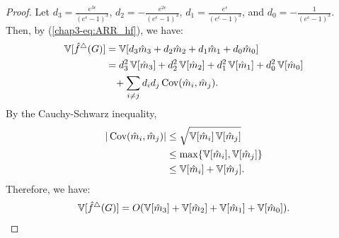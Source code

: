 \begin{proof}
Let $d_3 = \frac{e^{3\epsilon}}{(e^\epsilon-1)^3}$, $d_2 = - \frac{e^{2\epsilon}}{(e^\epsilon-1)^3}$,
$d_1 = \frac{e^{\epsilon}}{(e^\epsilon-1)^3}$, and
$d_0 = - \frac{1}{(e^\epsilon-1)^3}$.
Then, by (\ref{chap3-eq:ARR_hf}), we have:
\begin{align}
    \operatorname{\mathbb{V}}[\hat{f}^\triangle(G)]
    &= \operatorname{\mathbb{V}}[d_3 \hat{m}_3 + d_2 \hat{m}_2 + d_1 \hat{m}_1 + d_0 \hat{m}_0] \nonumber\\
    &= d_3^2 \operatorname{\mathbb{V}}[\hat{m}_3] + d_2^2 \operatorname{\mathbb{V}}[\hat{m}_2] + d_1^2 \operatorname{\mathbb{V}}[\hat{m}_1] + d_0^2 \operatorname{\mathbb{V}}[\hat{m}_0] \nonumber\\
    & \hspace{3mm} + \sum_{i \ne j} d_i d_j \operatorname{\text{Cov}}(\hat{m}_i, \hat{m}_j).
    \label{chap3-eq:V_hf_cov}
\end{align}
By the Cauchy-Schwarz inequality,
\begin{align}
|\operatorname{\text{Cov}}(\hat{m}_i, \hat{m}_j)|
&\leq \sqrt{\operatorname{\mathbb{V}}[\hat{m}_i]\operatorname{\mathbb{V}}[\hat{m}_j]} \nonumber\\
&\leq \max\{\operatorname{\mathbb{V}}[\hat{m}_i], \operatorname{\mathbb{V}}[\hat{m}_j]\} \nonumber\\
&\leq \operatorname{\mathbb{V}}[\hat{m}_i] + \operatorname{\mathbb{V}}[\hat{m}_j].
\label{chap3-eq:cov_hm_ij}
\end{align}
Therefore, we have:
\begin{align}
    \operatorname{\mathbb{V}}[\hat{f}^\triangle(G)]
    = O(\operatorname{\mathbb{V}}[\hat{m}_3] + \operatorname{\mathbb{V}}[\hat{m}_2] + \operatorname{\mathbb{V}}[\hat{m}_1] + \operatorname{\mathbb{V}}[\hat{m}_0]).
    \label{chap3-eq:V_hf_m3210}
\end{align}


\end{proof}
